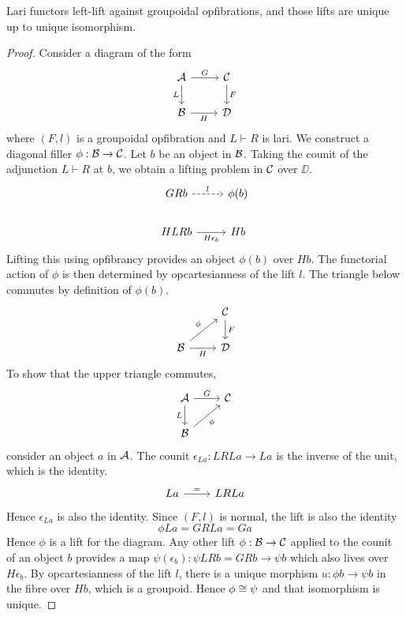 \begin{proposition}\label{prop:lari-orthogonal-groupoidal-opfibration}
  Lari functors left-lift against groupoidal opfibrations,
  and those lifts are unique up to unique isomorphism.
\end{proposition}
\begin{proof}
  Consider a diagram of the form
  \[ \begin{tikzcd}
	\AA & \CC \\
	\BB & \DD
	\arrow["G", from=1-1, to=1-2]
	\arrow["L"', from=1-1, to=2-1]
	\arrow["F", from=1-2, to=2-2]
	\arrow["H"', from=2-1, to=2-2]
    \end{tikzcd}\]
  where $(F,l)$ is a groupoidal opfibration and
  $L \vdash R$ is lari.
  We construct a diagonal filler $\phi : \BB \to \CC$.
  Let $b$ be an object in $\BB$.
  Taking the counit of the adjunction $L \vdash R$ at $b$,
  we obtain a lifting problem in $\CC$ over $\DD$.
  \[\begin{tikzcd}
	GRb & {\phi(b)} \\
	HLRb & Hb
	\arrow["l", dashed, from=1-1, to=1-2]
	\arrow["{H \epsilon_b}"', from=2-1, to=2-2]
    \end{tikzcd}\]
  Lifting this using opfibrancy provides an object $\phi(b)$ over $H b$.
  The functorial action of $\phi$ is then determined by
  opcartesianness of the lift $l$.
  The triangle below commutes by definition of $\phi(b)$.
  \[ \begin{tikzcd}
	& \CC \\
	\BB & \DD
	\arrow["F", from=1-2, to=2-2]
	\arrow["\phi", from=2-1, to=1-2]
	\arrow["H"', from=2-1, to=2-2]
    \end{tikzcd}\]  
  To show that the upper triangle commutes,
  \[\begin{tikzcd}
	\AA & \CC \\
	\BB
	\arrow["G", from=1-1, to=1-2]
	\arrow["L"', from=1-1, to=2-1]
	\arrow["\phi"', from=2-1, to=1-2]
    \end{tikzcd}\]
  consider an object $a$ in $\AA$.
  The counit $\epsilon_{La} : L R L a \to L a$
  is the inverse of the unit,
  which is the identity.
  \[\begin{tikzcd}
	{L a} & {L R L a}
	\arrow["{=}", from=1-1, to=1-2]
	\end{tikzcd}\]
  Hence $\epsilon_{La}$ is also the identity.
  Since $(F,l)$ is normal, the lift is also the identity
  \[ \phi L a = GRLa = G a\]
  Hence $\phi$ is a lift for the diagram.
  Any other lift $\phi : \BB \to \CC$ applied to the counit of
  an object $b$ provides a map $\psi(\epsilon_b) : \psi L R b = G R b \to \psi b$
  which also lives over $H \epsilon_b$.
  By opcartesianness of the lift $l$,
  there is a unique morphism $u : \phi b \to \psi b$
  in the fibre over $H b$, which is a groupoid.
  Hence $\phi \iso \psi$ and that isomorphism is unique.
\end{proof}

